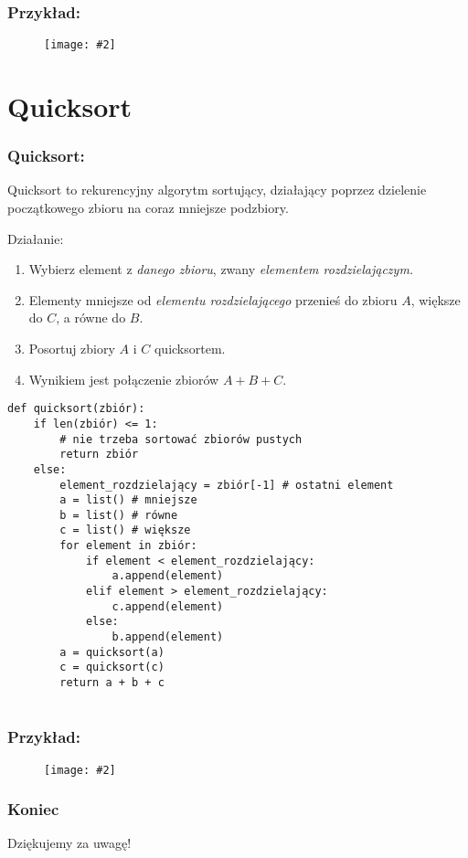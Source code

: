 \documentclass{beamer}
\newcommand{\obrazek}[2]{
        \begin{figure}[h]
            \centering
            \texttt{[image: \#2]}
        \end{figure}
    }
\begin{document}
\begin{frame}
    \frametitle{Przykład:}
    \obrazek{.5}{binarySearchExample.png}
\end{frame}

\section{Quicksort}
\begin{frame}
    \frametitle{Quicksort:}
    Quicksort to rekurencyjny algorytm sortujący, działający poprzez dzielenie początkowego zbioru na coraz mniejsze podzbiory.
    \vspace{5mm}

    Działanie:
    \begin{enumerate}
        \item Wybierz element z \emph{danego zbioru}, zwany \emph{elementem rozdzielajączym.}
        \item Elementy mniejsze od \emph{elementu rozdzielającego} przenieś do zbioru $A$, większe do $C$, a równe do $B$.
        \item Posortuj zbiory $A$ i $C$ quicksortem.
        \item Wynikiem jest połączenie zbiorów $A + B + C$.
    \end{enumerate}
\end{frame}
\begin{verbatim}
def quicksort(zbiór):
    if len(zbiór) <= 1:
        # nie trzeba sortować zbiorów pustych 
        return zbiór
    else:
        element_rozdzielający = zbiór[-1] # ostatni element
        a = list() # mniejsze
        b = list() # równe
        c = list() # większe
        for element in zbiór:
            if element < element_rozdzielający:
                a.append(element)
            elif element > element_rozdzielający:
                c.append(element)
            else:
                b.append(element)
        a = quicksort(a)
        c = quicksort(c)
        return a + b + c
        
    \end{verbatim}

\begin{frame}
    \frametitle{Przykład:}
    \obrazek{.5}{quicksortExample.png}
\end{frame}

\begin{frame}
    \frametitle{Koniec}
    \begin{center}
        Dziękujemy za uwagę!
    \end{center}
\end{frame}
\end{document}
